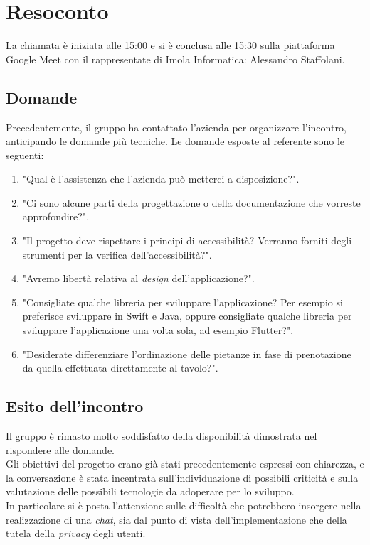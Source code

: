 \section{Resoconto}
La chiamata è iniziata alle 15:00 e si è conclusa alle 15:30 sulla piattaforma
Google Meet con il rappresentate di Imola Informatica: Alessandro Staffolani. \\

\subsection{Domande}
Precedentemente, il gruppo ha contattato l'azienda per organizzare l'incontro, anticipando le domande più tecniche.
Le domande esposte al referente sono le seguenti:
\begin{enumerate}
	\item "Qual è l'assistenza che l'azienda può metterci a disposizione?".
	\item "Ci sono alcune parti della progettazione o della documentazione che vorreste approfondire?".
	\item "Il progetto deve rispettare i principi di accessibilità? Verranno forniti degli strumenti per la verifica dell'accessibilità?".
	\item "Avremo libertà relativa al \textit{design} dell'applicazione?".
	\item "Consigliate qualche libreria per sviluppare l'applicazione? Per esempio si preferisce sviluppare in Swift e Java, oppure consigliate qualche libreria per sviluppare l'applicazione una volta sola, ad esempio Flutter?".
	\item "Desiderate differenziare l'ordinazione delle pietanze in fase di prenotazione da quella effettuata direttamente al tavolo?".
\end{enumerate}

\subsection{Esito dell'incontro}
Il gruppo è rimasto molto soddisfatto della disponibilità dimostrata nel rispondere alle domande. \\
Gli obiettivi del progetto erano già stati precedentemente espressi con chiarezza, e la conversazione è stata incentrata sull'individuazione di possibili criticità e sulla valutazione delle possibili tecnologie da adoperare per lo sviluppo. \\
In particolare si è posta l'attenzione sulle difficoltà che potrebbero insorgere nella realizzazione di una \textit{chat}, sia dal punto di vista dell'implementazione che della tutela della \textit{privacy} degli utenti.

